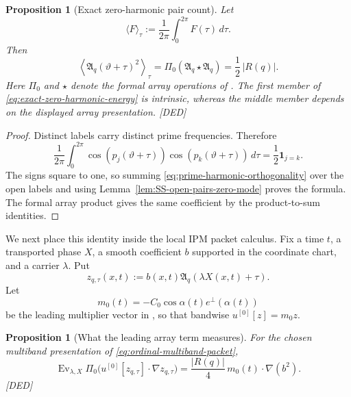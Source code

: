 \documentclass[11pt]{amsart}
\numberwithin{equation}{section}
\theoremstyle{plain}
\newtheorem{proposition}[theorem]{Proposition}
\theoremstyle{definition}
\theoremstyle{remark}
\begin{document}
\begin{proposition}[Exact zero-harmonic pair count]
\label{prop:exact-zero-harmonic-count}
Let
\begin{equation}
 \langle F\rangle_\tau
 :=\frac1{2\pi}\int_0^{2\pi}F(\tau)\,d\tau.
\label{eq:phase-average}
\end{equation}
Then
\begin{equation}
 \left\langle\mathfrak A_q(\vartheta+\tau)^2\right\rangle_\tau
 =\Pi_0(\mathfrak A_q\star\mathfrak A_q)
 =\frac12\,|R(q)|.
\label{eq:exact-zero-harmonic-energy}
\end{equation}
Here $\Pi_0$ and $\star$ denote the formal array operations of
\cite[(128)--(129)]{AlpogeBuckmasterCoiculescu2026}.  The first member of
\eqref{eq:exact-zero-harmonic-energy} is intrinsic, whereas the middle member
depends on the displayed array presentation.  \textup{[DED]}
\end{proposition}

\begin{proof}
Distinct labels carry distinct prime frequencies.  Therefore
\begin{equation}
 \frac1{2\pi}\int_0^{2\pi}
 \cos(p_j(\vartheta+\tau))\cos(p_k(\vartheta+\tau))\,d\tau
 =\frac12\mathbf 1_{j=k}.
\label{eq:prime-harmonic-orthogonality}
\end{equation}
The signs square to one, so summing
\eqref{eq:prime-harmonic-orthogonality} over the open labels and using
Lemma~\ref{lem:SS-open-pairs-zero-mode} proves the formula.  The formal array
product gives the same coefficient by the product-to-sum identities.
\end{proof}

We next place this identity inside the local IPM packet calculus.  Fix a
time $t$, a transported phase $X$, a smooth coefficient $b$ supported in the
coordinate chart, and a carrier $\lambda$.  Put
\begin{equation}
 z_{q,\tau}(x,t)
 :=b(x,t)\mathfrak A_q(\lambda X(x,t)+\tau).
\label{eq:ordinal-multiband-packet}
\end{equation}
Let
\begin{equation}
 m_0(t)=-C_0\cos\alpha(t)e^\perp(\alpha(t))
\label{eq:m0-definition}
\end{equation}
be the leading multiplier vector in
\cite[(115)--(119)]{AlpogeBuckmasterCoiculescu2026}, so that bandwise
$u^{[0]}[z]=m_0z$.

\begin{proposition}[What the leading array term measures]
\label{prop:leading-array-zero-mode}
For the chosen multiband presentation of \eqref{eq:ordinal-multiband-packet},
\begin{equation}
 \operatorname{Ev}_{\lambda,X}\Pi_0
 \bigl(u^{[0]}[z_{q,\tau}]\cdot\nabla z_{q,\tau}\bigr)
 =\frac{|R(q)|}{4}\,m_0(t)\cdot\nabla(b^2).
\label{eq:leading-array-zero-mode}
\end{equation}
\textup{[DED]}
\end{proposition}
\end{document}
